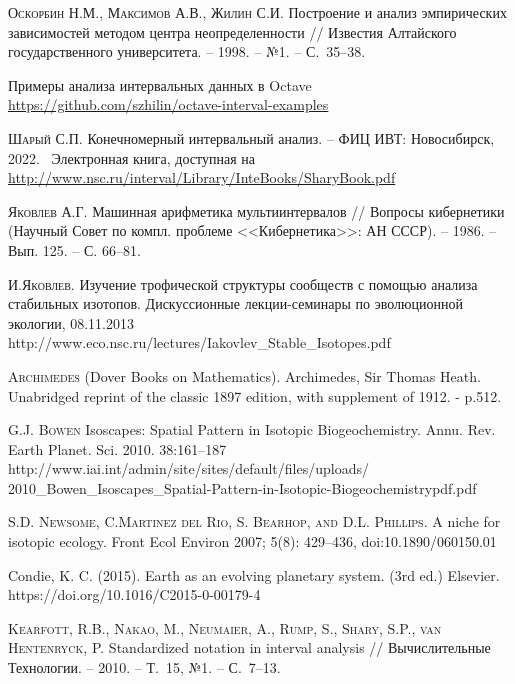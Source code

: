 \documentclass[a5paper,openany]{book}
\begin{document}
\begin{thebibliography}{00}
	
	\textsc{Оскорбин Н.М., Максимов А.В., Жилин С.И.} 
	Построение и анализ эмпирических зависимостей методом центра неопределенности // 
	Известия Алтайского государственного университета. -- 1998. -- №1. -- С.~35--38. 
	
	Примеры анализа интервальных данных в Octave \\ 
	\url{https://github.com/szhilin/octave-interval-examples}
	

	\textsc{Шарый С.П.} Конечномерный интервальный анализ. -- ФИЦ ИВТ: 
	Новосибирск, 2022. \     Электронная книга, доступная 
	на \url{http://www.nsc.ru/interval/Library/InteBooks/SharyBook.pdf} 

	\textsc{Яковлев А.Г.} Машинная арифметика мультиинтервалов // Вопросы кибернетики
	(Научный Совет по компл. проблеме <<Кибернетика>>: АН СССР). – 1986. – Вып. 125. –
	С. 66–81.

	  \textsc{И.Яковлев.} Изучение трофической структуры сообществ с помощью анализа стабильных изотопов. Дискуссионные лекции-семинары по эволюционной экологии, 08.11.2013 \\
	http://www.eco.nsc.ru/lectures/Iakovlev\_Stable\_Isotopes.pdf
	
 \textsc{Archimedes}
(Dover Books on Mathematics). 
Archimedes, Sir Thomas Heath. Unabridged reprint of the classic 1897 edition, with supplement of 1912. - p.512.

	
	\textsc{G.J. Bowen} Isoscapes: Spatial Pattern in Isotopic Biogeochemistry.  Annu. Rev. Earth Planet. Sci. 2010. 38:161–187 \\
	http://www.iai.int/admin/site/sites/default/files/uploads/ 2010\_Bowen\_Isoscapes\_Spatial-Pattern-in-Isotopic-Biogeochemistrypdf.pdf

	 \textsc{S.D. Newsome, C.Martinez del Rio, S. Bearhop, and D.L. Phillips.}
	A niche for isotopic ecology. Front Ecol Environ 2007; 5(8): 429–436, doi:10.1890/060150.01

	Condie, K. C. (2015). Earth as an evolving planetary system. (3rd ed.) Elsevier. \\ https://doi.org/10.1016/C2015-0-00179-4
	
	\textsc{Kearfott, R.B., Nakao, M., Neumaier, A., Rump, S., Shary, S.P., van Hentenryck, 
		P.} Standardized notation in interval analysis // Вычислительные Технологии. -- 
	2010. -- Т.~15, №1. -- С.~7--13. 
	

\end{thebibliography}
\end{document}
